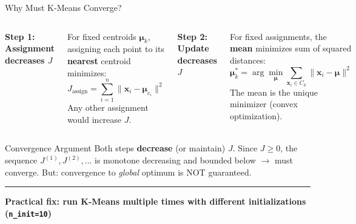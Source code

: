 \documentclass[8pt,aspectratio=169]{beamer}
\newcommand{\bottomnote}[1]{%
\vfill
\vspace{-2mm}
\textcolor{mllavender2}{\rule{\textwidth}{0.4pt}}
\vspace{1mm}
\footnotesize
\textbf{#1}
}
\newcommand{\highlight}[1]{\textcolor{mlorange}{\textbf{#1}}}
\begin{document}
\begin{frame}[t]{Why Must K-Means Converge?}
\begin{columns}[T]
\small
\textbf{Step 1: Assignment decreases $J$}

\footnotesize
For fixed centroids $\boldsymbol{\mu}_k$, assigning each point to its \highlight{nearest} centroid minimizes:
\[
J_{\text{assign}} = \sum_{i=1}^{n} \|\mathbf{x}_i - \boldsymbol{\mu}_{c_i}\|^2
\]
Any other assignment would increase $J$.

\small
\textbf{Step 2: Update decreases $J$}

\footnotesize
For fixed assignments, the \highlight{mean} minimizes sum of squared distances:
\[
\boldsymbol{\mu}_k^* = \arg\min_{\boldsymbol{\mu}} \sum_{\mathbf{x}_i \in C_k} \|\mathbf{x}_i - \boldsymbol{\mu}\|^2
\]
The mean is the unique minimizer (convex optimization).
\end{columns}

\vspace{3mm}
\begin{block}{Convergence Argument}
\footnotesize
Both steps \highlight{decrease} (or maintain) $J$. Since $J \geq 0$, the sequence $J^{(1)}, J^{(2)}, \ldots$ is monotone decreasing and bounded below $\to$ must converge. \textcolor{mlred}{But:} convergence to \emph{global} optimum is NOT guaranteed.
\end{block}
\bottomnote{Practical fix: run K-Means multiple times with different initializations (\texttt{n\_init=10})}
\end{frame}
\end{document}
